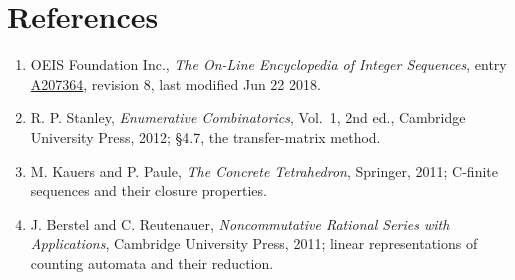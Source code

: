 \documentclass[11pt]{article}
\theoremstyle{definition}
\begin{document}
\section{References}

\begin{enumerate}

\item OEIS Foundation Inc., \emph{The On-Line Encyclopedia of Integer Sequences}, entry \href{https://oeis.org/A207364}{A207364}, revision 8, last modified Jun 22 2018.

\item R. P. Stanley, \emph{Enumerative Combinatorics}, Vol.~1, 2nd ed., Cambridge University Press, 2012; \S4.7, the transfer-matrix method.

\item M. Kauers and P. Paule, \emph{The Concrete Tetrahedron}, Springer, 2011; C-finite sequences and their closure properties.

\item J. Berstel and C. Reutenauer, \emph{Noncommutative Rational Series with Applications}, Cambridge University Press, 2011; linear representations of counting automata and their reduction.

\end{enumerate}
\end{document}
